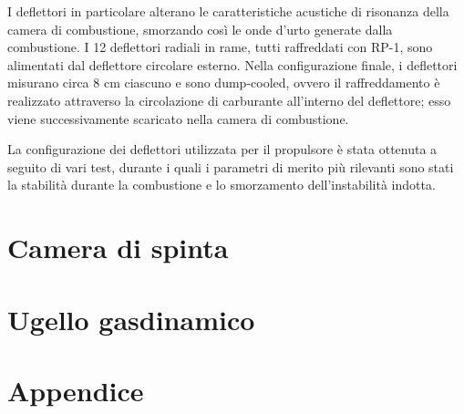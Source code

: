 \documentclass[11pt,a4paper]{article}
\begin{document}
I deflettori in particolare alterano le caratteristiche acustiche di risonanza della camera di combustione, smorzando così le onde d’urto generate dalla combustione. I 12 deflettori radiali in rame, tutti raffreddati con RP-1, sono alimentati dal deflettore circolare esterno. Nella configurazione finale, i deflettori misurano circa 8 cm ciascuno e sono dump-cooled, ovvero il raffreddamento è realizzato attraverso la circolazione di carburante all’interno del deflettore; esso viene successivamente scaricato nella camera di combustione.

La configurazione dei deflettori utilizzata per il propulsore è stata ottenuta a seguito di vari test, durante i quali i parametri di merito più rilevanti sono stati la stabilità durante la combustione e lo smorzamento dell’instabilità indotta.




\section{Camera di spinta}

\label{sec:camera di spinta}




\section{Ugello gasdinamico}

\label{sec:ugello}




\section{Appendice}

\label{sec:appendice}





\end{document}
